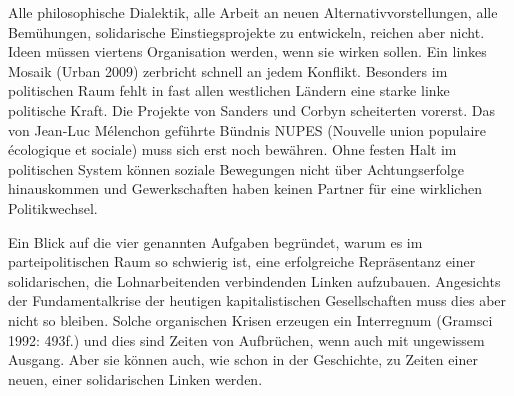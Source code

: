 \begin{multicols*}{2}
Alle philosophische Dialektik, alle Arbeit an neuen Alternativvorstellungen, alle Bemühungen, solidarische Einstiegsprojekte zu entwickeln, reichen aber nicht. Ideen müssen viertens Organisation werden, wenn sie wirken sollen. Ein linkes Mosaik (Urban 2009) zerbricht schnell an jedem Konflikt. Besonders im politischen Raum fehlt in fast allen westlichen Ländern eine starke linke politische Kraft. Die Projekte von Sanders und Corbyn scheiterten vorerst. Das von Jean-Luc Mélenchon geführte Bündnis NUPES (Nouvelle union populaire écologique et sociale) muss sich erst noch bewähren. Ohne festen Halt im politischen System können soziale Bewegungen nicht über Achtungserfolge hinauskommen und Gewerkschaften haben keinen Partner für eine wirklichen Politikwechsel.

Ein Blick auf die vier genannten Aufgaben begründet, warum es im parteipolitischen Raum so schwierig ist, eine erfolgreiche Repräsentanz einer solidarischen, die Lohnarbeitenden verbindenden Linken aufzubauen. Angesichts der Fundamentalkrise der heutigen kapitalistischen Gesellschaften muss dies aber nicht so bleiben. Solche organischen Krisen erzeugen ein Interregnum (Gramsci 1992: 493f.) und dies sind Zeiten von Aufbrüchen, wenn auch mit ungewissem Ausgang. Aber sie können auch, wie schon in der Geschichte, zu Zeiten einer neuen, einer solidarischen Linken werden.



    \printendnotes[custom]
    

\end{multicols*}
